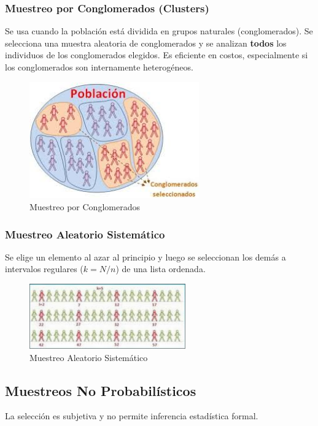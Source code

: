 \documentclass[12pt, letterpaper]{article}
\begin{document}
\subsubsection{Muestreo por Conglomerados (Clusters)}
Se usa cuando la población está dividida en grupos naturales (conglomerados). Se selecciona una muestra aleatoria de conglomerados y se analizan \textbf{todos} los individuos de los conglomerados elegidos. Es eficiente en costos, especialmente si los conglomerados son internamente heterogéneos.
\begin{figure}[htbp]
	\centering
	\includegraphics[width=0.65\textwidth]{MPC}
	\caption{Muestreo por Conglomerados}
	\label{fig:MPC}
\end{figure}


\subsubsection{Muestreo Aleatorio Sistemático}
Se elige un elemento al azar al principio y luego se seleccionan los demás a intervalos regulares ($k=N/n$) de una lista ordenada.
\begin{figure}[htbp]
	\centering
	\includegraphics[width=0.6\textwidth]{MASIS}
	\caption{Muestreo Aleatorio Sistemático}
	\label{fig:MASIS}
\end{figure}
\newpage

\subsection{Muestreos No Probabilísticos}
La selección es subjetiva y no permite inferencia estadística formal.
\end{document}
